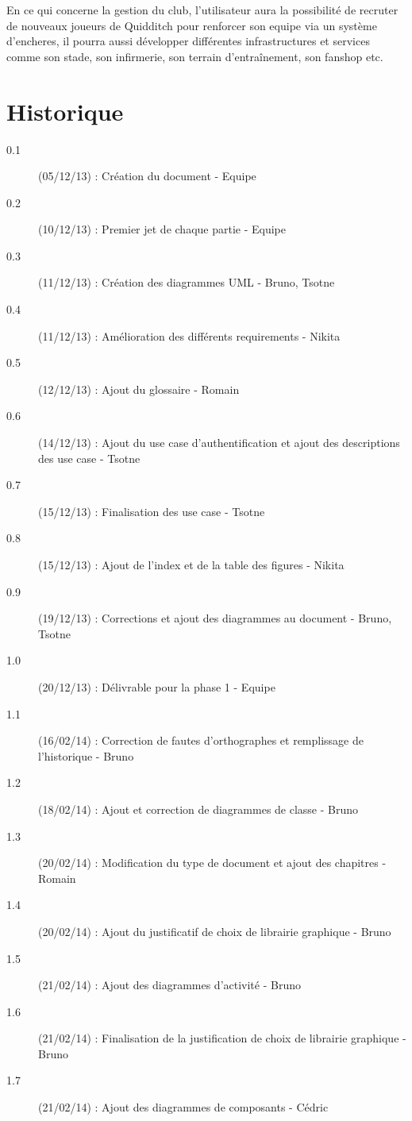 \documentclass[a4paper]{report}
\begin{document}
En ce qui concerne la gestion du \gls{club}, l'\gls{utilisateur} aura la possibilité de recruter de nouveaux \glspl{joueur} de Quidditch pour renforcer son \gls{equipe} via un système d'\glspl{enchere}, il pourra aussi développer différentes infrastructures et services comme son stade, son infirmerie, son terrain d'entraînement, son fanshop etc.


\printglossary[numberedsection]
\section{Historique}
\begin{description}
    \item[0.1] (05/12/13) : Création du document - Equipe
    \item[0.2] (10/12/13) : Premier jet de chaque partie - Equipe
    \item[0.3] (11/12/13) : Création des diagrammes UML - Bruno, Tsotne
    \item[0.4] (11/12/13) : Amélioration des différents requirements - Nikita
    \item[0.5] (12/12/13) : Ajout du glossaire - Romain
    \item[0.6] (14/12/13) : Ajout du use case d'authentification et ajout des descriptions des use case - Tsotne
    \item[0.7] (15/12/13) : Finalisation des use case - Tsotne
    \item[0.8] (15/12/13) : Ajout de l'index et de la table des figures - Nikita
    \item[0.9] (19/12/13) : Corrections et ajout des diagrammes au document - Bruno, Tsotne
    \item[1.0] (20/12/13) : Délivrable pour la phase 1 - Equipe
    \item[1.1] (16/02/14) : Correction de fautes d'orthographes et remplissage de l'historique - Bruno
    \item[1.2] (18/02/14) : Ajout et correction de diagrammes de classe - Bruno
    \item[1.3] (20/02/14) : Modification du type de document et ajout des chapitres - Romain
    \item[1.4] (20/02/14) : Ajout du justificatif de choix de librairie graphique - Bruno
    \item[1.5] (21/02/14) : Ajout des diagrammes d'activité - Bruno
    \item[1.6] (21/02/14) : Finalisation de la justification de choix de librairie graphique - Bruno
    \item[1.7] (21/02/14) : Ajout des diagrammes de composants - Cédric
\end{description}
\end{document}
